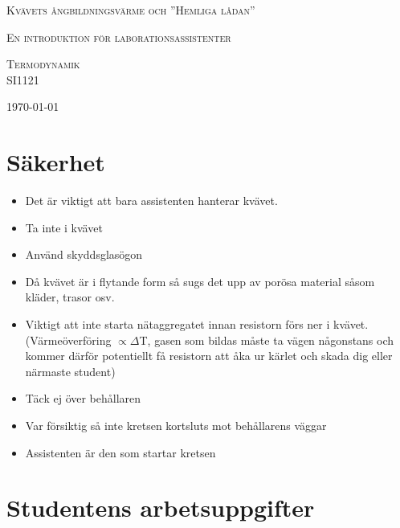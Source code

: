 \documentclass[11pt]{article}
\begin{document}
\begin{titlepage}
	\centering
	{\scshape\LARGE Kvävets ångbildningsvärme och ”Hemliga lådan” \par}
	{\scshape En introduktion för laborationsassistenter \par}
	\vspace{4cm}
	{\scshape\Large Termodynamik \\ SI1121\par}
	\vspace{2cm}
	\vfill
	{\large \today\par}
\end{titlepage}

\section{Säkerhet}
 
\begin{itemize}
    \item Det är viktigt att bara assistenten hanterar kvävet.
    \item Ta inte i kvävet
    \item Använd skyddsglasögon
    \item Då kvävet är i flytande form så sugs det upp av porösa material såsom kläder, trasor osv.
    \item Viktigt att inte starta nätaggregatet innan resistorn förs ner i kvävet. (Värmeöverföring $\propto \Delta $T, gasen som bildas måste ta vägen någonstans och kommer därför potentiellt få resistorn att åka ur kärlet och skada dig eller närmaste student)
    \item Täck ej över behållaren
    \item Var försiktig så inte kretsen kortsluts mot behållarens väggar
    \item Assistenten är den som startar kretsen
\end{itemize}

\section{Studentens arbetsuppgifter}
\end{document}
